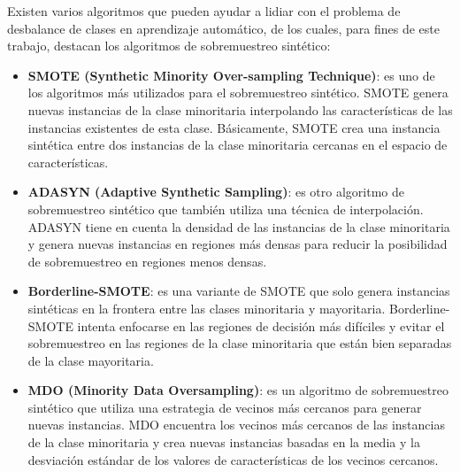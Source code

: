 Existen varios algoritmos que pueden ayudar a lidiar con el problema de desbalance de clases en aprendizaje automático, de los cuales, para fines de este trabajo, destacan los algoritmos de sobremuestreo sintético:

\begin{itemize}
	\item \textbf{SMOTE (Synthetic Minority Over-sampling Technique)}: es uno de los algoritmos más utilizados para el sobremuestreo sintético. SMOTE genera nuevas instancias de la clase minoritaria interpolando las características de las instancias existentes de esta clase. Básicamente, SMOTE crea una instancia sintética entre dos instancias de la clase minoritaria cercanas en el espacio de características.

	\item \textbf{ADASYN (Adaptive Synthetic Sampling)}: es otro algoritmo de sobremuestreo sintético que también utiliza una técnica de interpolación. ADASYN tiene en cuenta la densidad de las instancias de la clase minoritaria y genera nuevas instancias en regiones más densas para reducir la posibilidad de sobremuestreo en regiones menos densas.

	\item \textbf{Borderline-SMOTE}: es una variante de SMOTE que solo genera instancias sintéticas en la frontera entre las clases minoritaria y mayoritaria. Borderline-SMOTE intenta enfocarse en las regiones de decisión más difíciles y evitar el sobremuestreo en las regiones de la clase minoritaria que están bien separadas de la clase mayoritaria.

	\item \textbf{MDO (Minority Data Oversampling)}: es un algoritmo de sobremuestreo sintético que utiliza una estrategia de vecinos más cercanos para generar nuevas instancias. MDO encuentra los vecinos más cercanos de las instancias de la clase minoritaria y crea nuevas instancias basadas en la media y la desviación estándar de los valores de características de los vecinos cercanos.
\end{itemize}

